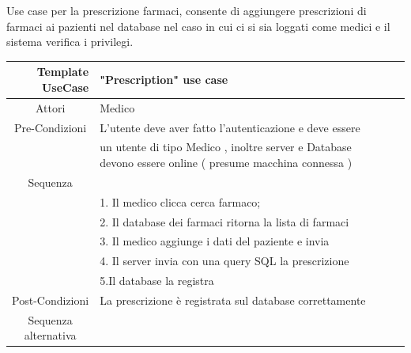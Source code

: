 \documentclass{article}
\begin{document}
Use case per la prescrizione farmaci, consente di aggiungere prescrizioni di farmaci ai pazienti nel database nel caso in cui ci si sia loggati come medici e il sistema verifica i privilegi.

\vspace{1cm}

\begin{center}

	\begin{tabular}{r@{\vspace{0.4cm}}ll}
	

	\hline
	
	\textbf{Template UseCase  } &  \textbf{       "Prescription" use case } \\

	\hline
	
	\multicolumn{1}{c}{Attori}  & Medico \\

	\cline{1-1}
\hline

	\multicolumn{1}{c}{Pre-Condizioni}  & L’utente deve aver fatto l’autenticazione e deve essere\\ \cline{1-1}&

un utente di tipo Medico , inoltre server e Database devono essere online ( presume macchina connessa )\\

\hline
	\multicolumn{1}{c}{Sequenza}    \\ \cline{1-1}&
    1.  Il medico clicca cerca farmaco; \\&
    2. Il database dei farmaci ritorna la lista di farmaci \\&
    3. Il medico aggiunge i dati del paziente e invia\\&
    4. Il server invia con una query SQL la prescrizione  \\&
    5.Il database la registra  \\

\hline
	
\multicolumn{1}{c}{Post-Condizioni}  &La prescrizione è registrata sul database correttamente \\ \cline{1-1}
\hline

\multicolumn{1}{c}{Sequenza alternativa}  \\     

\hline

	\end{tabular}

\end{center}
\end{document}
